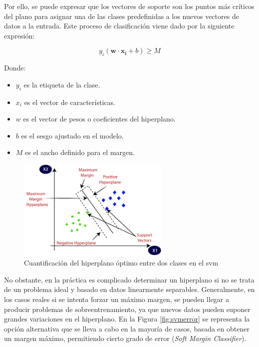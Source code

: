 \vspace{3mm}

Por ello, se puede expresar que los vectores de soporte son los puntos más críticos del plano para asignar una de las clases predefinidas a los nuevos vectores de datos a la entrada. Este proceso de clasificación viene dado por la siguiente expresión: \cite{svmmedium} 

\[ y_i(\mathbf{w} \cdot \mathbf{x_i} + b) \geq M\]

    Donde:
\begin{itemize}
    \renewcommand{\labelitemi}{}
    \item \(y_i\) es la etiqueta de la clase. 
    \item \(x_i\) es el vector de características.
    \item \(w\) es el vector de pesos o coeficientes del hiperplano.
    \item \(b\) es el sesgo ajustado en el modelo.
    \item \(M\) es el ancho definido para el margen.
\end{itemize}

\vspace{3mm}

\begin{figure}[h!]
    \centering
    \includegraphics[width=0.65\textwidth]{img/teoria/svm.png}
    \caption{Cuantificación del hiperplano óptimo entre dos clases en el \acrshort{svm} \cite{svmmedium2}}
    \label{fig:svm}
\end{figure}

\vspace{3mm}

No obstante, en la práctica es complicado determinar un hiperplano si no se trata de un problema ideal y basado en datos linearmente separables. Generalmente, en los casos reales si se intenta forzar un máximo margen, se pueden llegar a producir problemas de sobreentrenamiento, ya que nuevos datos pueden suponer grandes variaciones en el hiperplano. En la Figura \ref{fig:svmerror} se representa la opción alternativa que se lleva a cabo en la mayoría de casos, basada en obtener un margen máximo, permitiendo cierto grado de error (\textit{Soft Margin Classifier}). \cite{matlab} \cite{svmciencia}

